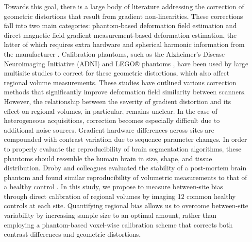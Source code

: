 \documentclass{article}
\begin{document}
Towards this goal, there is a large body of literature addressing the correction of geometric distortions that result from gradient non-linearities. These corrections fall into two main categories: phantom-based deformation field estimation and direct magnetic field gradient measurement-based deformation estimation, the latter of which requires extra hardware and spherical harmonic information from the manufacturer \cite{fonov2010improved}. Calibration phantoms, such as the Alzheimer's Disease Neuroimaging Initiative (ADNI) \cite{gunter2009measurement} and LEGO® phantoms \cite{caramanos2010gradient}, have been used by large multisite studies to correct for these geometric distortions, which also affect regional volume measurements. These studies have outlined various correction methods that significantly improve deformation field similarity between scanners. However, the relationship between the severity of gradient distortion and its effect on regional volumes, in particular, remains unclear. In the case of heterogeneous acquisitions, correction becomes especially difficult due to additional noise sources. Gradient hardware differences across sites are compounded with contrast variation due to sequence parameter changes. In order to properly evaluate the reproducibility of brain segmentation algorithms, these phantoms should resemble the humain brain in size, shape, and tissue distribution. Droby and colleagues evaluated the stability of a post-mortem brain phantom and found similar reproducibility of volumetric measurements to that of a healthy control \cite{droby2015human}. In this study, we propose to measure between-site bias through direct calibration of regional volumes by imaging 12 common healthy controls at each site. Quantifying regional bias allows us to overcome between-site variability by increasing sample size to an optimal amount, rather than employing a phantom-based voxel-wise calibration scheme that corrects both contrast differences and geometric distortions. 
\end{document}
